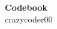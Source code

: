 \documentclass[9pt, a4paper,landscape]{extreport}
\begin{document}
\begin{multicols*}{3}
\begin{center}
{\Huge \bfseries Codebook}\\[0.2em]
{\small crazycoder00}\\[0.8em]    
\end{center}

\tableofcontents








\end{multicols*}
\end{document}
